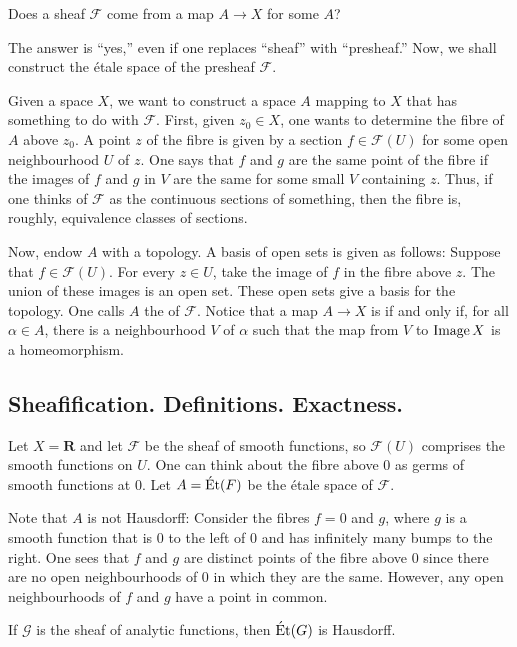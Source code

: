 \documentclass [11 pt, oneside] {article}
\begin{document}
\begin{problem}
	Does a sheaf $\mathscr{F}$ come from a map $A\longrightarrow X$ for some $A$?
\end{problem}

The answer is ``yes,'' even if one replaces ``sheaf'' with ``presheaf.'' Now, we shall construct the \'etale space of the presheaf $\mathscr{F}$. 

Given a space $X$, we want to construct a space $A$ mapping to $X$ that has something to do with $\mathscr{F}$. First, given $z_0 \in X$, one wants to determine the fibre of $A$ above $z_0$. A point $z$ of the fibre is given by a section $f\in \mathscr{F}(U)$ for some open neighbourhood $U$ of $z$. One says that $f$ and $g$ are the same point of the fibre if the images of $f$ and $g$ in $V$ are the same for some small $V$ containing $z$. Thus, if one thinks of $\mathscr{F}$ as the continuous sections of something, then the fibre is, roughly, equivalence classes of sections.

Now, endow $A$ with a topology. A basis of open sets is given as follows: Suppose that $f\in \mathscr{F}(U)$. For every $z\in U$, take the image of $f$ in the fibre above $z$. The union of these images is an open set. These open sets give a basis for the topology. One calls $A$ the  of $\mathscr{F}$. Notice that a map $A\longrightarrow X$ is  if and only if, for all $\alpha\in A$, there is a neighbourhood $V$ of $\alpha$ such that the map from $V$ to $\operatorname{Image} X$ is a homeomorphism.

\subsection{Sheafification. Definitions. Exactness.}
\begin{example}[ ]\label{}\text{}
Let $X=\mathbf{R}$ and let $\mathscr{F}$ be the sheaf of smooth functions, so $\mathscr{F}(U)$ comprises the smooth functions on $U$. One can think about the fibre above $0$ as germs of smooth functions at $0$. Let $A = \operatorname{\acute Et} ( \relax{F})$ be the \'etale space of $\mathscr{F}$. 

Note that $A$ is not Hausdorff: Consider the fibres $f=0$ and $g$, where $g$ is a smooth function that is $0$ to the left of $0$ and has infinitely many bumps to the right. 
One sees that $f$ and $g$ are distinct points of the fibre above $0$ since there are no open neighbourhoods of $0$ in which they are the same. However, any open neighbourhoods of $f$ and $g$ have a point in common.

If $\mathscr{G}$ is the sheaf of analytic functions, then $\operatorname{\acute Et}(\relax{G})$ is Hausdorff.
\end{example}
\end{document}
